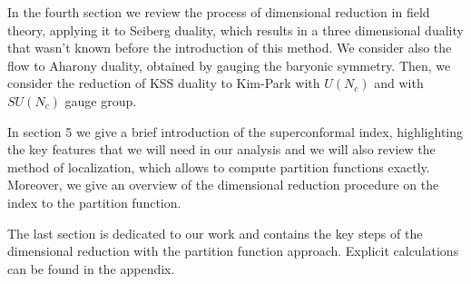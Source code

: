 In the fourth section we review the process of dimensional reduction in field theory, applying it to Seiberg duality, which results in a three dimensional duality that wasn't known before the introduction of this method. 
We  consider also the flow to Aharony duality, obtained by gauging the baryonic symmetry.
Then, we consider the reduction of KSS duality to Kim-Park with $U(N_c)$ and with $SU(N_c)$ gauge group.

In section 5 we give a brief introduction of the superconformal index, highlighting the key features that we will need in our analysis and we will also review the method of localization, which allows to compute partition functions exactly.
Moreover, we give an overview of the dimensional reduction procedure on the index to the partition function.

The last section is dedicated to our work and contains the key steps of the dimensional reduction with the partition function approach. 
Explicit calculations can be found in the appendix.



